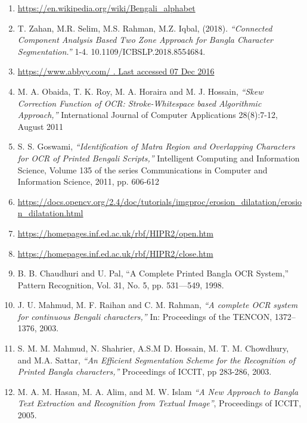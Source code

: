 \documentclass[a4paper,12pt]{article}
\begin{document}
\begin{enumerate}

\item \hypertarget{1}{\url{https://en.wikipedia.org/wiki/Bengali_alphabet}}
\item \hypertarget{2}{T. Zahan, M.R. Selim, M.S. Rahman, M.Z. Iqbal, (2018). \textit{“Connected Component Analysis Based Two Zone Approach for Bangla Character Segmentation.”} 1-4. 10.1109/ICBSLP.2018.8554684.}
\item \hypertarget{3}{\url{https://www.abbyy.com/ . Last accessed 07 Dec 2016}}
\item \hypertarget{4}{M. A. Obaida, T. K. Roy, M. A. Horaira and M. J. Hossain, \textit{“Skew Correction Function of OCR: Stroke-Whitespace based Algorithmic Approach,”} International Journal of Computer Applications 28(8):7-12, August 2011}
\item \hypertarget{5}{S. S. Goswami, \textit{“Identification of Matra Region and Overlapping Characters for OCR of Printed Bengali Scripts,”} Intelligent Computing and Information Science, Volume 135 of the series Communications in Computer and Information Science, 2011, pp. 606-612}
\item \hypertarget{6}{\url{https://docs.opencv.org/2.4/doc/tutorials/imgproc/erosion_dilatation/erosion_dilatation.html}}
\item \hypertarget{7}{\url{https://homepages.inf.ed.ac.uk/rbf/HIPR2/open.htm}}
\item \hypertarget{8}{\url{https://homepages.inf.ed.ac.uk/rbf/HIPR2/close.htm}}
\item \hypertarget{9}{B. B. Chaudhuri and U. Pal, “A Complete Printed Bangla OCR System,” Pattern Recognition, Vol. 31, No. 5, pp. 531—549, 1998.}
\item \hypertarget{10}{J. U. Mahmud, M. F. Raihan and C. M. Rahman, \textit{“A complete OCR system for continuous Bengali characters,”} In: Proceedings of the TENCON, 1372–1376, 2003.}
\item \hypertarget{11}{S. M. M. Mahmud, N. Shahrier, A.S.M D. Hossain, M. T. M. Chowdhury, and M.A. Sattar, \textit{“An Efficient Segmentation Scheme for the Recognition of Printed Bangla characters,”} Proceedings of ICCIT, pp 283-286, 2003.}
\item \hypertarget{12}{M. A. M. Hasan, M. A. Alim, and M. W. Islam \textit{“A New Approach to Bangla Text Extraction and Recognition from Textual Image”}, Proceedings of ICCIT, 2005.}

\end{enumerate}
\end{document}
